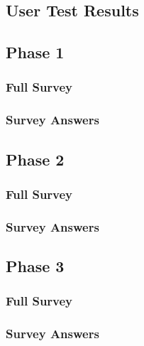 \clearpage


\begin{appendix}

\chapter{User Test Results}


\section{Phase 1}
\subsection{Full Survey}
\subsection{Survey Answers}


\section{Phase 2}
\subsection{Full Survey}
\subsection{Survey Answers}

\section{Phase 3}
\subsection{Full Survey}


\subsection{Survey Answers}

\end{appendix}